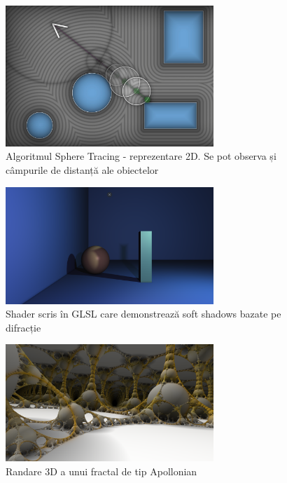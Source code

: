 \documentclass[12pt,a4paper]{report}
\numberwithin{equation}{section} %
\begin{document}
\begin{figure}[ht]
	\centering
	\includegraphics[width=0.7\textwidth]{pics/raymarching.png}
	\caption{Algoritmul Sphere Tracing - reprezentare 2D. Se pot observa și câmpurile de distanță ale obiectelor\protect\footnotemark}
	\label{fig:raymarching}
\end{figure}

\begin{figure}[ht]
	\centering
	\includegraphics[width=0.7\textwidth]{pics/diffraction.png}
	\caption{Shader scris în GLSL care demonstrează soft shadows bazate pe difracție\protect\footnotemark}
	\label{fig:diffraction}
\end{figure}

\begin{figure}[ht]
	\centering
	\includegraphics[width=0.7\textwidth]{pics/fractal.png}
	\caption{Randare 3D a unui fractal de tip Apollonian\protect\footnotemark}
	\label{fig:fractal}
\end{figure}
\end{document}
